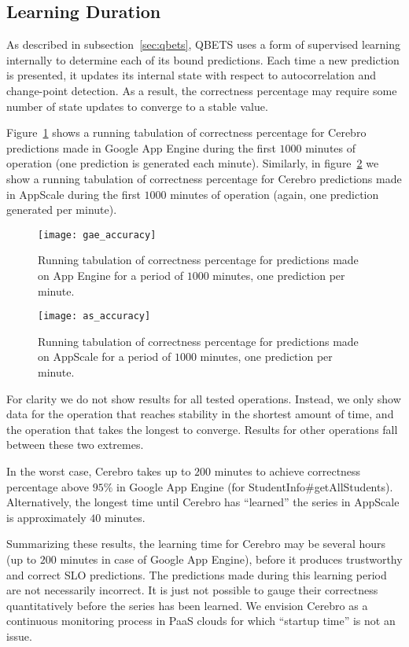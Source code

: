 \subsection{Learning Duration}
\label{sec:learning}

As described in subsection~\ref{sec:qbets},
QBETS uses a form of supervised learning internally to determine each of its
bound predictions.  Each time a new prediction is presented, it updates its
internal state with respect to autocorrelation and change-point detection.  As
a result, the correctness percentage may require some number of state updates
to converge to a stable value.

Figure~\ref{fig:gae_accuracy} shows a running tabulation of
correctness percentage for Cerebro
predictions made in Google App Engine during the first 
$1000$ minutes of operation (one prediction is generated each minute). 
Similarly, in figure~\ref{fig:as_accuracy} we show a running tabulation of
correctness percentage for Cerebro
predictions made in AppScale during the first 
$1000$ minutes of operation (again, one prediction generated per minute). 

\begin{figure}
\centering
\texttt{[image: gae\_accuracy]}
\caption{Running tabulation of correctness percentage for predictions made on App Engine for a period
of $1000$ minutes, one prediction per minute.}
\label{fig:gae_accuracy}
\end{figure}

\begin{figure}
\centering
\texttt{[image: as\_accuracy]}
\caption{Running tabulation of correctness percentage for predictions made on AppScale for a period
of $1000$ minutes, one prediction per minute.}
\label{fig:as_accuracy}
\end{figure}

For clarity we do not show results for all tested operations. Instead,
we only show data for the operation that reaches stability in the shortest
amount of time, and the operation that takes the longest to converge.
Results for other operations fall between these two extremes.

In the worst case, Cerebro takes up to $200$ minutes to 
achieve correctness percentage above $95\%$
in Google App Engine (for StudentInfo\#getAllStudents).
Alternatively, the longest time until Cerebro has ``learned'' the series in
AppScale is approximately $40$ minutes.

Summarizing these results, 
the learning time for Cerebro may be
several hours (up to $200$ minutes in case of 
Google App Engine), before it produces trustworthy and correct 
SLO predictions.  The predictions made during this learning period are not
necessarily incorrect.  It is just not possible to gauge their correctness
quantitatively before the series has been learned.  We envision Cerebro as a
continuous monitoring process in PaaS clouds for which ``startup time'' is not 
an issue.